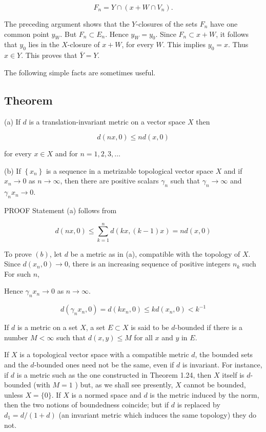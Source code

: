 \documentclass[10pt]{article}
\begin{document}
$$
F_{n}=Y \cap\left(x+W \cap V_{n}\right) .
$$

The preceding argument shows that the $Y$-closures of the sets $F_{n}$ have one common point $y_{W}$. But $F_{n} \subset E_{n}$. Hence $y_{W}=y_{0}$. Since $F_{n} \subset x+W$, it follows that $y_{0}$ lies in the $X$-closure of $x+W$, for every $W$. This implies $y_{0}=x$. Thus $x \in Y$. This proves that $\bar{Y}=Y$.

The following simple facts are sometimes useful.

\subsection{Theorem}
(a) If $d$ is a translation-invariant metric on a vector space $X$ then

$$
d(n x, 0) \leq n d(x, 0)
$$

for every $x \in X$ and for $n=1,2,3, \ldots$

(b) If $\left\{x_{n}\right\}$ is a sequence in a metrizable topological vector space $X$ and if $x_{n} \rightarrow 0$ as $n \rightarrow \infty$, then there are positive scalars $\gamma_{n}$ such that $\gamma_{n} \rightarrow \infty$ and $\gamma_{n} x_{n} \rightarrow 0$.

PROOF Statement (a) follows from

$$
d(n x, 0) \leq \sum_{k=1}^{n} d(k x,(k-1) x)=n d(x, 0)
$$

To prove $(b)$, let $d$ be a metric as in (a), compatible with the topology of $X$. Since $d\left(x_{n}, 0\right) \rightarrow 0$, there is an increasing sequence of positive integers $n_{k}$ such For such $n$,

Hence $\gamma_{n} x_{n} \rightarrow 0$ as $n \rightarrow \infty$.

$$
d\left(\gamma_{n} x_{n}, 0\right)=d\left(k x_{n}, 0\right) \leq k d\left(x_{n}, 0\right)<k^{-1}
$$

If $d$ is a metric on a set $X$, a set $E \subset X$ is said to be $d$-bounded if there is a number $M<\infty$ such that $d(x, y) \leq M$ for all $x$ and $y$ in $E$.

If $X$ is a topological vector space with a compatible metric $d$, the bounded sets and the $d$-bounded ones need not be the same, even if $d$ is invariant. For instance, if $d$ is a metric such as the one constructed in Theorem 1.24, then $X$ itself is $d$-bounded (with $M=1$ ) but, as we shall see presently, $X$ cannot be bounded, unless $X=\{0\}$. If $X$ is a normed space and $d$ is the metric induced by the norm, then the two notions of boundedness coincide; but if $d$ is replaced by $d_{1}=d /(1+d)$ (an invariant metric which induces the same topology) they do not.
\end{document}
